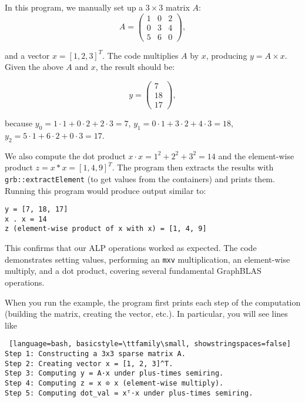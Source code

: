 In this program, we manually set up a $3\times3$ matrix $A$:
\[
A = \begin{pmatrix}
1 & 0 & 2 \\
0 & 3 & 4 \\
5 & 6 & 0
\end{pmatrix},
\]


and a vector $x = [1,2,3]^T$. The code multiplies $A$ by $x$, producing $y = A \times x$. Given the above $A$ and $x$, the result should be:

\[
y = \begin{pmatrix}
7 \\
18 \\
17
\end{pmatrix},
\]

because
$y_0 = 1\cdot 1 + 0\cdot 2 + 2\cdot 3 = 7$,
$y_1 = 0\cdot1 + 3\cdot2 + 4\cdot3 = 18$,
$y_2 = 5\cdot1 + 6\cdot2 + 0\cdot3 = 17$.

We also compute the dot product $x \cdot x = 1^2 + 2^2 + 3^2 = 14$ and the element-wise product $z = x * x = [1,4,9]^T$. The program then extracts the results with \texttt{grb::extractElement} (to get values from the containers) and prints them. Running this program would produce output similar to:

\begin{verbatim}
y = [7, 18, 17]
x . x = 14
z (element-wise product of x with x) = [1, 4, 9]
\end{verbatim}

This confirms that our ALP operations worked as expected. The code demonstrates setting values, performing an \texttt{mxv} multiplication, an element-wise multiply, and a dot product, covering several fundamental GraphBLAS operations.


When you run the example, the program first prints each step of the computation (building the matrix, creating the vector, etc.). In particular, you will see lines like

\begin{lstlisting} [language=bash, basicstyle=\ttfamily\small, showstringspaces=false]
Step 1: Constructing a 3x3 sparse matrix A.
Step 2: Creating vector x = [1, 2, 3]^T.
Step 3: Computing y = A·x under plus‐times semiring.
Step 4: Computing z = x ⊙ x (element‐wise multiply).
Step 5: Computing dot_val = xᵀ·x under plus‐times semiring.

\end{lstlisting}


